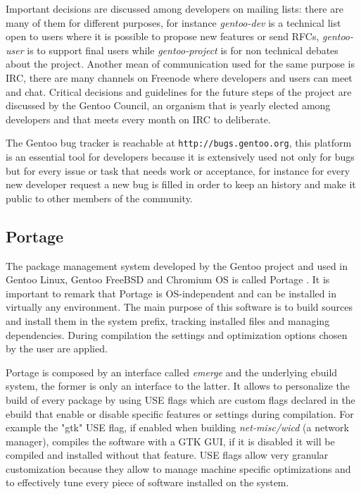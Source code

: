 Important decisions are discussed among developers on mailing lists: there are many of them for different purposes, for instance \emph{gentoo-dev} is a technical list open to users where it is possible to propose new features or send RFCs, \emph{gentoo-user} is to support final users while \emph{gentoo-project} is for non technical debates about the project. Another mean of communication used for the same purpose is IRC, there are many channels on Freenode \cite{gentoo_irc} where developers and users can meet and chat.
Critical decisions and guidelines for the future steps of the project are discussed by the Gentoo Council, an organism that is yearly elected among developers and that meets every month on IRC to deliberate.

The Gentoo bug tracker is reachable at \texttt{http://bugs.gentoo.org}, this platform is an essential tool for developers because it is extensively used not only for bugs but for every issue or task that needs work or acceptance, for instance for every new developer request a new bug is filled in order to keep an history and make it public to other members of the community.



\subsection{Portage}
The package management system developed by the Gentoo project and used in Gentoo Linux, Gentoo FreeBSD and Chromium OS is called Portage \cite{gentoo_portage}. It is important to remark that Portage is OS-independent and can be installed in virtually any environment.
The main purpose of this software is to build sources and install them in the system prefix, tracking installed files and managing dependencies. During compilation the settings and optimization options chosen by the user are applied.

Portage is composed by an interface called \emph{emerge} and the underlying ebuild system, the former is only an interface to the latter. It allows to personalize the build of every package by using USE flags which are custom flags declared in the ebuild that enable or disable specific features or settings during compilation. For example the "gtk" USE flag, if enabled when building \emph{net-misc/wicd} (a network manager), compiles the software with a GTK GUI, if it is disabled it will be compiled and installed without that feature. USE flags allow very granular customization because they allow to manage machine specific optimizations and to effectively tune every piece of software installed on the system.

